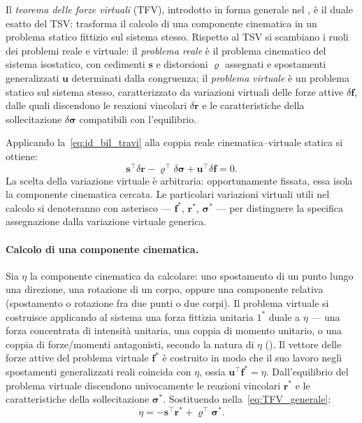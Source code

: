 Il \emph{teorema delle forze virtuali} (TFV), introdotto
in forma generale nel , è il duale esatto
del TSV: trasforma il calcolo di una componente cinematica
in un problema statico fittizio sul sistema stesso.
Rispetto al TSV si scambiano i ruoli dei problemi reale e
virtuale: il \emph{problema reale} è il problema
cinematico del sistema isostatico, con cedimenti $\bm{s}$
e distorsioni $\bm{\varrho}$ assegnati e spostamenti
generalizzati $\bm{u}$ determinati dalla congruenza; il
\emph{problema virtuale} è un problema statico sul sistema
stesso, caratterizzato da variazioni virtuali delle forze
attive $\delta\bm{f}$, dalle quali discendono le reazioni
vincolari $\delta\bm{r}$ e le caratteristiche della
sollecitazione $\delta\bm{\sigma}$ compatibili con
l'equilibrio.

Applicando la~\eqref{eq:id_bil_travi} alla coppia reale
cinematica--virtuale statica si ottiene:
\begin{equation}\label{eq:TFV_generale}
	\bm{s}^\top\delta\bm{r} -
	\bm{\varrho}^\top\delta\bm{\sigma} +
	\bm{u}^\top\delta\bm{f} = 0.
\end{equation}
La scelta della variazione virtuale è arbitraria:
opportunamente fissata, essa isola la componente
cinematica cercata. Le particolari variazioni virtuali
utili nel calcolo si denoteranno con asterisco ---
$\bm{f}^*$, $\bm{r}^*$, $\bm{\sigma}^*$ --- per
distinguere la specifica assegnazione dalla variazione
virtuale generica.


\paragraph{Calcolo di una componente cinematica.}
Sia $\eta$ la componente cinematica da calcolare: uno
spostamento di un punto lungo una direzione, una rotazione
di un corpo, oppure una componente relativa (spostamento
o rotazione fra due punti o due corpi). Il problema
virtuale si costruisce applicando al sistema una forza
fittizia unitaria $1^*$ duale a $\eta$ --- una forza
concentrata di intensità unitaria, una coppia di momento
unitario, o una coppia di forze/momenti antagonisti,
secondo la natura di $\eta$ (). Il vettore
delle forze attive del problema virtuale $\bm{f}^*$ è
costruito in modo che il suo lavoro negli spostamenti
generalizzati reali coincida con $\eta$, ossia
$\bm{u}^\top\bm{f}^* = \eta$. Dall'equilibrio del problema
virtuale discendono univocamente le reazioni vincolari
$\bm{r}^*$ e le caratteristiche della sollecitazione
$\bm{\sigma}^*$. Sostituendo nella~\eqref{eq:TFV_generale}:
\begin{equation}\label{eq:TFV_formula}
	\boxed{\,\eta = -\bm{s}^\top\bm{r}^* +
		\bm{\varrho}^\top\bm{\sigma}^*.\,}
\end{equation}

